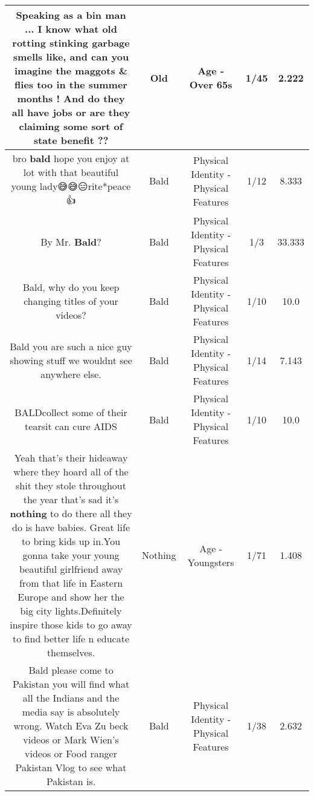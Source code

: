 \documentclass[11pt]{article}
\newlength\mylength
\begin{document}
\begin{center}
\begin{longtable}{|C{.65\mylength}|C{.30\mylength}|C{.12\mylength}|C{.12\mylength}|C{.12\mylength}|}
  \small Speaking as a bin man ...  I know what \textbf{old} rotting stinking garbage smells like, and can you imagine the maggots \& flies too in the summer months !    And  do they all have jobs or are they claiming some sort of state benefit ??\normalsize   & Old & Age - Over 65s & 1/45 & 2.222 \\  \hline
  \small bro \textbf{bald} hope you enjoy at lot with that beautiful young lady😅😅😑rite*peace👍\normalsize   & Bald & Physical Identity - Physical Features & 1/12 & 8.333 \\  \hline
  \small By Mr. \textbf{Bald}?\normalsize   & Bald & Physical Identity - Physical Features & 1/3 & 33.333 \\  \hline
  \small Bald, why do you keep changing titles of your videos?\normalsize   & Bald & Physical Identity - Physical Features & 1/10 & 10.0 \\  \hline
  \small Bald you are such a nice guy showing stuff we wouldnt see anywhere else.\normalsize   & Bald & Physical Identity - Physical Features & 1/14 & 7.143 \\  \hline
  \small BALDcollect some of their tearsit can cure AIDS\normalsize   & Bald & Physical Identity - Physical Features & 1/10 & 10.0 \\  \hline
  \small Yeah that's their hideaway where they hoard all of the shit they stole throughout the year that's sad it's \textbf{nothing} to do there all they do is have babies. Great life to bring kids up in.You gonna take your young beautiful girlfriend away from that life in Eastern Europe and show her the big city lights.Definitely inspire those kids to go away to find better life n educate themselves.\normalsize   & Nothing & Age - Youngsters & 1/71 & 1.408 \\  \hline
  \small Bald please come to Pakistan you will find what all the Indians and the media say is absolutely wrong. Watch Eva Zu beck videos or Mark Wien's videos or Food ranger Pakistan Vlog to see what Pakistan is.\normalsize   & Bald & Physical Identity - Physical Features & 1/38 & 2.632 \\  \hline

\end{longtable}
\end{center}
\end{document}

